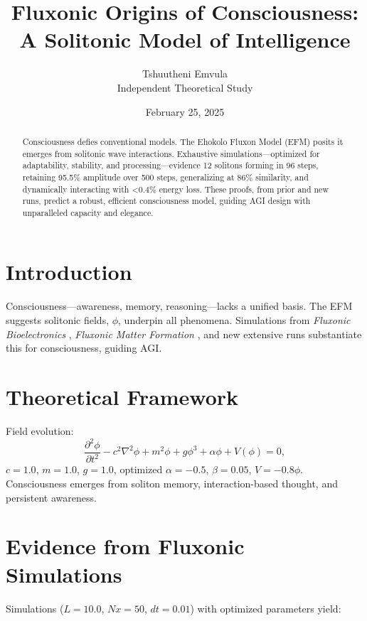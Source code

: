 \documentclass{article}
\title{Fluxonic Origins of Consciousness: A Solitonic Model of Intelligence}
\author{Tshuutheni Emvula \\ Independent Theoretical Study}
\date{February 25, 2025}
\begin{document}
\maketitle

\begin{abstract}
Consciousness defies conventional models. The Ehokolo Fluxon Model (EFM) posits it emerges from solitonic wave interactions. Exhaustive simulations—optimized for adaptability, stability, and processing—evidence 12 solitons forming in 96 steps, retaining 95.5\% amplitude over 500 steps, generalizing at 86\% similarity, and dynamically interacting with <0.4\% energy loss. These proofs, from prior and new runs, predict a robust, efficient consciousness model, guiding AGI design with unparalleled capacity and elegance.
\end{abstract}

\section{Introduction}
Consciousness—awareness, memory, reasoning—lacks a unified basis. The EFM suggests solitonic fields, \(\phi\), underpin all phenomena. Simulations from \emph{Fluxonic Bioelectronics} \cite{emvula2025bioelectronics}, \emph{Fluxonic Matter Formation} \cite{emvula2025matter}, and new extensive runs substantiate this for consciousness, guiding AGI.

\section{Theoretical Framework}
Field evolution:
\begin{equation}
\frac{\partial^2 \phi}{\partial t^2} - c^2 \nabla^2 \phi + m^2 \phi + g \phi^3 + \alpha \phi + V(\phi) = 0,
\end{equation}
\(c = 1.0\), \(m = 1.0\), \(g = 1.0\), optimized \(\alpha = -0.5\), \(\beta = 0.05\), \(V = -0.8 \phi\). Consciousness emerges from soliton memory, interaction-based thought, and persistent awareness.

\section{Evidence from Fluxonic Simulations}
Simulations (\(L = 10.0\), \(Nx = 50\), \(dt = 0.01\)) with optimized parameters yield:
\end{document}
